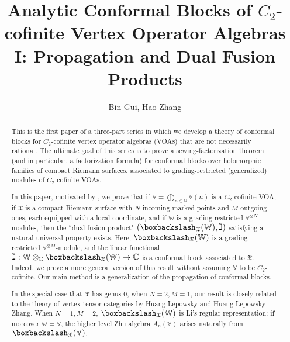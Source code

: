 \documentclass[11pt,b5paper,notitlepage]{article}
\title{Analytic Conformal Blocks of $C_2$-cofinite Vertex Operator Algebras I: Propagation and Dual Fusion Products}
\author{{\sc Bin Gui, Hao Zhang}
}
\date{}
\theoremstyle{definition}
\theoremstyle{plain}
\newcommand{\fk}{\mathfrak}
\newcommand{\Vbb}{\mathbb V}
\newcommand{\Wbb}{\mathbb W}
\newcommand{\Cbb}{\mathbb C}
\newcommand{\Nbb}{\mathbb N}
\newcommand{\<}{\left\langle}
\renewcommand{\>}{\right\rangle}
\newcommand{\fx}{\mathfrak{X}}
\newcommand{\bbs}{\boxbackslash}
\numberwithin{equation}{subsection}
\begin{document}
\sloppy %
	\setcounter{section}{-1}
	
	
	
	\maketitle
	
	
\newcommand\blfootnote[1]{%
	\begingroup
	\renewcommand\thefootnote{}\footnote{#1}%
	\addtocounter{footnote}{-1}%
	\endgroup
}



\begin{abstract}
This is the first paper of a three-part series in which we develop a theory of conformal blocks for $C_2$-cofinite vertex operator algebras (VOAs) that are not necessarily rational. The ultimate goal of this series is to prove a sewing-factorization theorem (and in particular, a factorization formula) for conformal blocks over holomorphic families of compact Riemann surfaces, associated to grading-restricted (generalized) modules of $C_2$-cofinite VOAs.

In this paper, motivated by \cite{KZ-conformal-block}, we prove that if $\Vbb=\bigoplus_{n\in\Nbb}\Vbb(n)$ is a $C_2$-cofinite VOA, if $\fx$ is a compact Riemann surface with $N$ incoming marked points and $M$ outgoing ones, each  equipped with a local coordinate, and if $\Wbb$ is a grading-restricted $\Vbb^{\otimes N}$-modules, then the ``dual fusion product" $(\bbs_\fx(\Wbb),\gimel)$ satisfying a natural universal property exists. Here, $\bbs_\fx(\Wbb)$ is a grading-restricted $\Vbb^{\otimes M}$-module, and the linear functional $\gimel:\Wbb\otimes_\Cbb\bbs_\fx(\Wbb)\rightarrow\Cbb$ is a conformal block associated to $\fx$. Indeed, we prove a more general version of this result without assuming $\Vbb$ to be $C_2$-cofinite. Our main method is a generalization of the propagation of conformal blocks.

In the special case that $\fk X$ has genus $0$, when $N=2,M=1$, our result is closely related to the theory of vertex tensor categories by Huang-Lepowsky and Huang-Lepowsky-Zhang. When $N=1,M=2$, $\bbs_\fx(\Wbb)$ is Li's regular representation; if moreover $\Wbb=\Vbb$, the higher level Zhu algebra $A_n(\Vbb)$ arises naturally from $\bbs_\fx(\Vbb)$.
\end{abstract}
\end{document}
